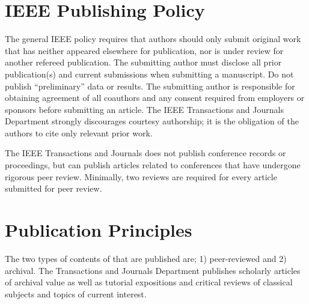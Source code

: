 \documentclass[journal]{IEEEtai}
\begin{document}
\section{IEEE Publishing Policy}

The general IEEE policy requires that authors should only submit original work that has neither appeared elsewhere for publication, nor is under review for another refereed publication. The submitting author must disclose all prior publication(s) and current submissions when submitting a manuscript. Do not publish ``preliminary'' data or results. The submitting author is responsible for obtaining agreement of all coauthors and any consent required from employers or sponsors before submitting an article. The IEEE Transactions and Journals Department strongly discourages courtesy authorship; it is the obligation of the authors to cite only relevant prior work.

The IEEE Transactions and Journals does not publish conference records or proceedings, but can publish articles related to conferences that have undergone rigorous peer review. Minimally, two reviews are required for every article submitted for peer review.

\section{Publication Principles}

The two types of contents of that are published are; 1) peer-reviewed and 2) archival. The Transactions and Journals Department publishes scholarly articles of archival value as well as tutorial expositions and critical reviews of classical subjects and topics of current interest. 
\end{document}
